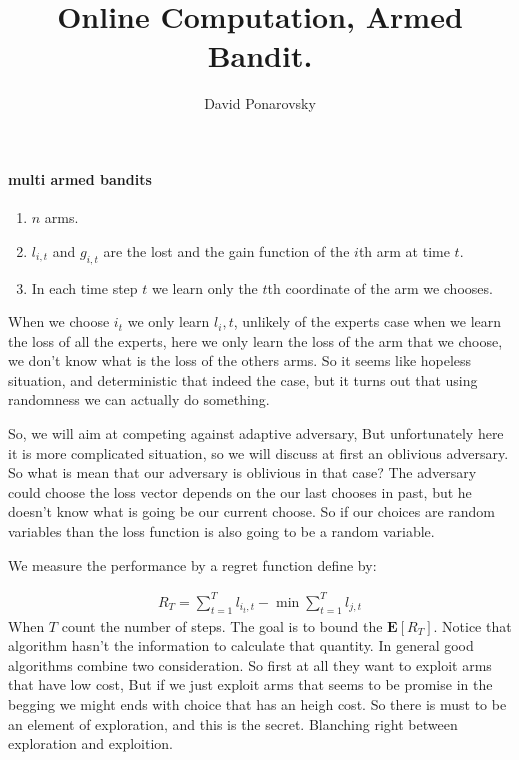 \documentclass{article}
\newcommand{\expp}[1]{ \mathbf{E} \left[ {#1} \right]}
\begin{document}
\newcommand{\dalg}[1]{\expp{#1 : \text{alg} \sim \tilde{\text{alg}}}}
\newcommand{\dsig}[1]{\expp{#1 : \sigma \sim \tilde{\sigma}}}
\newcommand{\calg}{c_{\text{alg}}}
\newcommand{\cbase}{c_{\text{base}}}


\title{Online Computation, Armed Bandit.} 
\author{David Ponarovsky}
\maketitle

\begin{multicols*}{2}
  \paragraph{multi armed bandits}
  \begin{enumerate}
    \item $n$ arms.
    \item $l_{i,t}$ and $g_{i,t}$ are the lost and the gain function of the $i$th arm at time $t$.    \item In each time step $t$ we learn only the $t$th coordinate of the arm we chooses.     
  \end{enumerate}
  When we choose $i_{t}$ we only learn $l_{i},t$, unlikely of the experts case when we learn the loss of all the experts, here we only learn the loss of the arm that we choose, we don't know what is the loss of the others arms. So it seems like hopeless situation, and deterministic that indeed the case, but it turns out that using randomness we can actually do something. 

  So, we will aim at competing against adaptive adversary, But unfortunately here it is more complicated situation, so we will discuss at first an oblivious adversary. So what is mean that our adversary is oblivious in that case? The adversary could choose the loss vector depends on the our last chooses in past, but he doesn't know what is going be our current choose. So if our choices are random variables than the loss function is also going to be a random variable.    

  We measure the performance by a regret function define by:  

  \begin{equation*}
    \begin{split}
      R_{T} = \sum_{t=1}^{T}{l_{i_{t},t}} - \min \sum_{t=1}^{T}{l_{j,t}}
    \end{split}
  \end{equation*}
  When $T$ count the number of steps. The goal is to bound the $\expp{R_{T}}$. Notice that algorithm hasn't the information to calculate that quantity. In general good algorithms combine two consideration. So first at all they want to exploit arms that have low cost, But if we just exploit arms that seems to be promise in the begging we might ends with choice that has an heigh cost. So there is must to be an element of exploration, and this is the secret. Blanching right between exploration and exploition. 


\end{multicols*}
\end{document}

